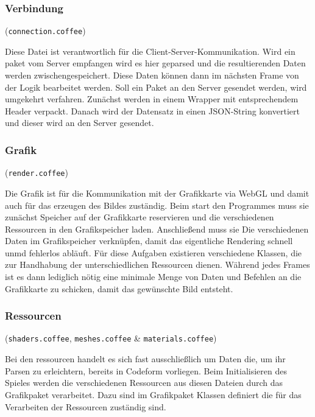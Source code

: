 \subsubsection{Verbindung} (\verb+connection.coffee+)

Diese Datei ist verantwortlich für die Client-Server-Kommunikation. Wird ein paket vom Server empfangen wird es hier geparsed und die resultierenden Daten werden zwischengespeichert. Diese Daten können dann im nächsten Frame von der Logik bearbeitet werden.
Soll ein Paket an den Server gesendet werden, wird umgekehrt verfahren. Zunächst werden in einem Wrapper mit entsprechendem Header verpackt. Danach wird der Datensatz in einen JSON-String konvertiert und dieser wird an den Server gesendet.


\subsubsection{Grafik} (\verb+render.coffee+)

Die Grafik ist für die Kommunikation mit der Grafikkarte via WebGL und damit auch für das erzeugen des Bildes zuständig. Beim start den Programmes muss sie zunächst Speicher auf der Grafikkarte reservieren und die verschiedenen Ressourcen in den Grafikspeicher laden. Anschließend muss sie Die verschiedenen Daten im Grafikspeicher verknüpfen, damit das eigentliche Rendering schnell unmd fehlerlos abläuft. Für diese Aufgaben existieren verschiedene Klassen, die zur Handhabung der unterschiedlichen Ressourcen dienen.
Während jedes Frames ist es dann lediglich nötig eine minimale Menge von Daten und Befehlen an die Grafikkarte zu schicken, damit das gewünschte Bild entsteht.


\subsubsection{Ressourcen} (\verb+shaders.coffee+, \verb+meshes.coffee+ \& \verb+materials.coffee+)

Bei den ressourcen handelt es sich fast ausschließlich um Daten die, um ihr Parsen zu erleichtern, bereits in Codeform vorliegen.
Beim Initialisieren des Spieles werden die verschiedenen Ressourcen aus diesen Dateien durch das Grafikpaket verarbeitet. Dazu sind im Grafikpaket Klassen definiert die für das Verarbeiten der Ressourcen zuständig sind.